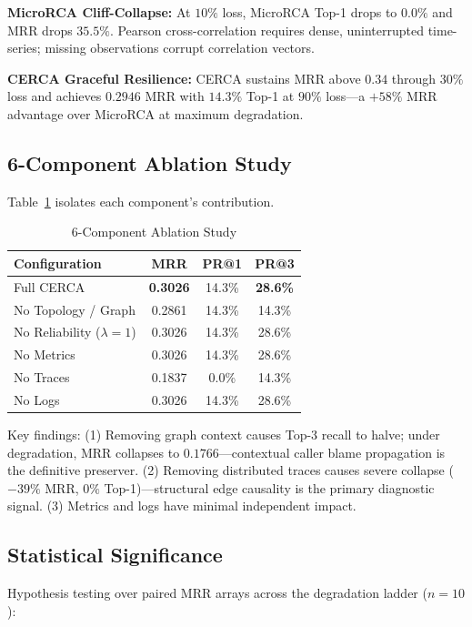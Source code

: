 \documentclass[conference]{IEEEtran}
\begin{document}
\noindent\textbf{MicroRCA Cliff-Collapse:} At $10\%$ loss, MicroRCA Top-1 drops to $0.0\%$ and MRR drops $35.5\%$. Pearson cross-correlation requires dense, uninterrupted time-series; missing observations corrupt correlation vectors.

\noindent\textbf{CERCA Graceful Resilience:} CERCA sustains MRR above $0.34$ through $30\%$ loss and achieves $0.2946$ MRR with $14.3\%$ Top-1 at $90\%$ loss---a $+58\%$ MRR advantage over MicroRCA at maximum degradation.

\subsection{6-Component Ablation Study}

Table~\ref{tab:ablation} isolates each component's contribution.

\begin{table}[htbp]
\caption{6-Component Ablation Study}
\label{tab:ablation}
\begin{tabular}{lccc}
\toprule
\textbf{Configuration} & \textbf{MRR} & \textbf{PR@1} & \textbf{PR@3} \\
\midrule
Full CERCA & \textbf{0.3026} & 14.3\% & \textbf{28.6\%} \\
No Topology / Graph & 0.2861 & 14.3\% & 14.3\% \\
No Reliability ($\lambda=1$) & 0.3026 & 14.3\% & 28.6\% \\
No Metrics & 0.3026 & 14.3\% & 28.6\% \\
No Traces & 0.1837 & 0.0\% & 14.3\% \\
No Logs & 0.3026 & 14.3\% & 28.6\% \\
\bottomrule
\end{tabular}
\end{table}

\noindent Key findings: (1) Removing graph context causes Top-3 recall to halve; under degradation, MRR collapses to $0.1766$---contextual caller blame propagation is the definitive preserver. (2) Removing distributed traces causes severe collapse ($-39\%$ MRR, $0\%$ Top-1)---structural edge causality is the primary diagnostic signal. (3) Metrics and logs have minimal independent impact.

\subsection{Statistical Significance}

Hypothesis testing over paired MRR arrays across the degradation ladder ($n=10$):
\end{document}
